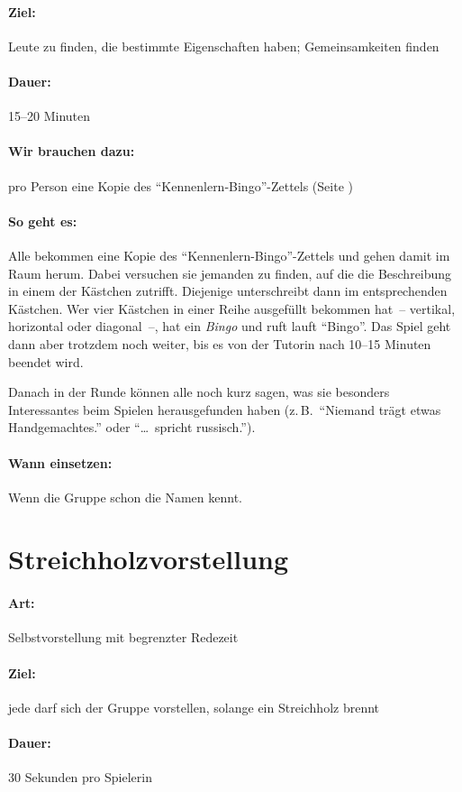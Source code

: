 \paragraph{Ziel:} Leute zu finden, die bestimmte Eigenschaften haben; Gemeinsamkeiten finden
\paragraph{Dauer:} 15--20 Minuten
\paragraph{Wir brauchen dazu:} pro Person eine Kopie des "`Kennenlern-Bingo"'-Zettels (Seite \pageref{bingo})
\paragraph{So geht es:} Alle bekommen eine Kopie des "`Kennenlern-Bingo"'-Zettels und gehen damit im Raum herum. Dabei versuchen sie jemanden zu finden, auf die die Beschreibung in einem der Kästchen zutrifft. Diejenige unterschreibt dann im entsprechenden Kästchen. Wer vier Kästchen in einer Reihe ausgefüllt bekommen hat~-- vertikal, horizontal oder diagonal~--, hat ein \emph{Bingo} und ruft lauft "`Bingo"'. Das Spiel geht dann aber trotzdem noch weiter, bis es von der Tutorin nach 10--15 Minuten beendet wird.

Danach in der Runde können alle noch kurz sagen, was sie besonders Interessantes beim Spielen herausgefunden haben (z.\,B.~"`Niemand trägt etwas Handgemachtes."' oder "`\ldots\ spricht russisch."').
\paragraph{Wann einsetzen:} Wenn die Gruppe schon die Namen kennt.

\section{Streichholzvorstellung}
\paragraph{Art:} Selbstvorstellung mit begrenzter Redezeit
\paragraph{Ziel:} jede darf sich der Gruppe vorstellen, solange ein Streichholz brennt
\paragraph{Dauer:} 30 Sekunden pro Spielerin
